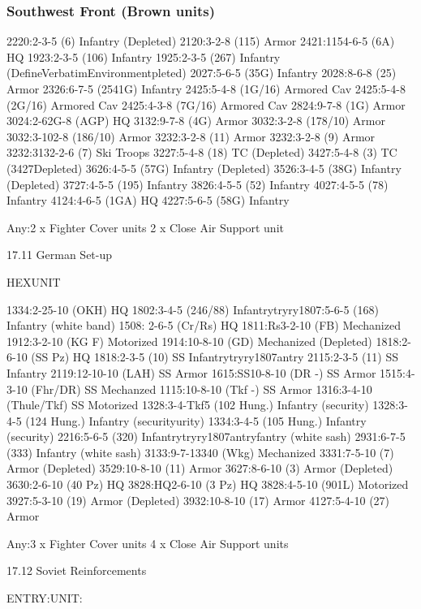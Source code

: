 \documentclass[10pt]{article}
\begin{document}
\newpage

\subsubsection*{Southwest Front (Brown units)}

2220:2-3-5 (6) Infantry (Depleted)
2120:3-2-8 (115) Armor
2421:1154-6-5 (6A) HQ
1923:2-3-5 (106) Infantry
1925:2-3-5 (267) Infantry (DefineVerbatimEnvironmentpleted)
2027:5-6-5 (35G) Infantry
2028:8-6-8 (25) Armor
2326:6-7-5 (2541G) Infantry
2425:5-4-8 (1G/16) Armored Cav
2425:5-4-8 (2G/16) Armored Cav
2425:4-3-8 (7G/16) Armored Cav
2824:9-7-8 (1G) Armor
3024:2-62G-8 (AGP) HQ
3132:9-7-8 (4G) Armor
3032:3-2-8 (178/10) Armor
3032:3-102-8 (186/10) Armor
3232:3-2-8 (11) Armor
3232:3-2-8 (9) Armor
3232:3132-2-6 (7) Ski Troops
3227:5-4-8 (18) TC (Depleted)
3427:5-4-8 (3) TC (3427Depleted)
3626:4-5-5 (57G) Infantry (Depleted)
3526:3-4-5 (38G) Infantry (Depleted)
3727:4-5-5 (195) Infantry
3826:4-5-5 (52) Infantry
4027:4-5-5 (78) Infantry
4124:4-6-5 (1GA) HQ
4227:5-6-5 (58G) Infantry


Any:2 x Fighter Cover units
2 x Close Air Support unit

\newpage

17.11 German Set-up

HEXUNIT

1334:2-25-10 (OKH) HQ
1802:3-4-5 (246/88) Infantrytryry1807:5-6-5 (168) Infantry (white band)
1508: 2-6-5 (Cr/Rs) HQ
1811:Rs3-2-10 (FB) Mechanized
1912:3-2-10 (KG F) Motorized
1914:10-8-10 (GD) Mechanized (Depleted)
1818:2-6-10 (SS Pz) HQ
1818:2-3-5 (10) SS Infantrytryry1807antry
2115:2-3-5 (11) SS Infantry
2119:12-10-10 (LAH) SS Armor
1615:SS10-8-10 (DR -) SS Armor
1515:4-3-10 (Fhr/DR) SS Mechanzed
1115:10-8-10 (Tkf -) SS Armor
1316:3-4-10 (Thule/Tkf) SS Motorized
1328:3-4-Tkf5 (102 Hung.) Infantry (security)
1328:3-4-5 (124 Hung.) Infantry (securityurity)
1334:3-4-5 (105 Hung.) Infantry (security)
2216:5-6-5 (320) Infantrytryry1807antryfantry (white sash)
2931:6-7-5 (333) Infantry (white sash)
3133:9-7-13340 (Wkg) Mechanized 
3331:7-5-10 (7) Armor (Depleted)
3529:10-8-10 (11) Armor
3627:8-6-10 (3) Armor (Depleted)
3630:2-6-10 (40 Pz) HQ
3828:HQ2-6-10 (3 Pz) HQ
3828:4-5-10 (901L) Motorized
3927:5-3-10 (19) Armor (Depleted)
3932:10-8-10 (17) Armor
4127:5-4-10 (27) Armor

Any:3 x       Fighter Cover units
4 x Close Air Support units

17.12 Soviet Reinforcements

ENTRY:UNIT:
\end{document}
